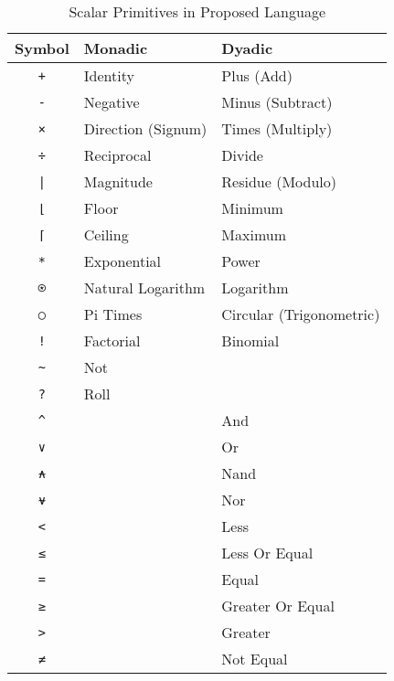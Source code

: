 \documentclass[numbers,preprint]{sigplanconf}
\begin{document}
\begin{table}
\centering
\begin{tabular}{cll}
\toprule
Symbol                   & Monadic            & Dyadic \\
\midrule
\texttt{+}               & Identity           & Plus (Add) \\
\texttt{-}               & Negative           & Minus (Subtract) \\
\texttt{×}               & Direction (Signum) & Times (Multiply) \\
\texttt{÷}               & Reciprocal         & Divide \\
\texttt{|}               & Magnitude          & Residue (Modulo) \\
\texttt{⌊}               & Floor              & Minimum \\
\texttt{⌈}               & Ceiling            & Maximum \\
\texttt{*}               & Exponential        & Power \\
\texttt{⍟}               & Natural Logarithm  & Logarithm \\
\texttt{○}               & Pi Times           & Circular (Trigonometric) \\
\texttt{!}               & Factorial          & Binomial \\
\texttt{\textasciitilde} & Not                & \\
\texttt{?}               & Roll               & \\
\texttt{\^}              &                    & And \\
\texttt{∨}               &                    & Or \\
\texttt{⍲}               &                    & Nand \\
\texttt{⍱}               &                    & Nor \\
\texttt{<}               &                    & Less \\
\texttt{≤}               &                    & Less Or Equal \\
\texttt{=}               &                    & Equal \\
\texttt{≥}               &                    & Greater Or Equal \\
\texttt{>}               &                    & Greater \\
\texttt{≠}               &                    & Not Equal \\
\end{tabular}
\caption{Scalar Primitives in Proposed Language}
\label{tab:scalarprims}
\end{table}
\end{document}
